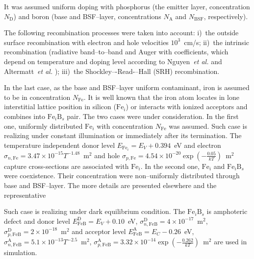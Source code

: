 It was assumed uniform doping with phosphorus (the emitter layer, concentration $N_\mathrm{D}$)
and boron (base and BSF--layer, concentrations $N_\mathrm{A}$ and $N_\mathrm{BSF}$, respectively).

The following recombination processes were taken into account:
i)~the outside surface recombination with electron and hole velocities $10^3$~cm/s;
ii)~the intrinsic recombination (radiative band--to--band and Auger with coefficients,
which depend on temperature and doping level according
to Nguyen~\emph{et al.} \cite{Si_BtB} and Altermatt~\emph{et al.} \cite{Si_Auger});
iii)~the Shockley–-Read-–Hall (SRH) recombination.

In the last case, as the base and BSF--layer uniform contaminant, iron is assumed to be in concentration $N_\mathrm{Fe}$.
It is well known that the iron atom locates in lone interstitial lattice position in silicon ($\mathrm{Fe}_i$) or
interacts with ionized acceptors and combines into $\mathrm{Fe}_i\mathrm{B}_s$ pair.
The two cases were under consideration.
In the first one, uniformly distributed $\mathrm{Fe}_i$ with concentration $N_\mathrm{Fe}$ was assumed.
Such case is realizing under constant illumination or immediately after its termination.
The temperature independent donor level $E_{\mathrm{Fe}_i} = E_V+0.394$~eV \cite{Rein2,MurphyJAP2011,Kohno}
and electron $\sigma_{n,{\mathrm{Fe}}}=3.47\times10^{-15}T^{-1.48}$~m$^2$ and
hole $\sigma_{p,{\mathrm{Fe}}}=4.54\times10^{-20}\exp\left(-\frac{0.05}{kT}\right)$~m$^2$ capture cross-sections \cite{ROUGIEUX2018,Paudyal}
are associated with $\mathrm{Fe}_i$.
In the second one, $\mathrm{Fe}_i$ and $\mathrm{Fe}_i\mathrm{B}_s$ were coexistence.
Their concentration were non--uniformly distributed through base and BSF--layer.
The more details are presented elsewhere \cite{Olikh2019SM} and the representative

Such case is realizing under dark equilibrium condition.
The $\mathrm{Fe}_i\mathrm{B}_s$ is amphoteric defect and donor level $E_{\mathrm{FeB}}^\mathrm{D}= E_V+0.10$~eV,
$\sigma_{n,{\mathrm{FeB}}}^\mathrm{D}=4\times10^{-17}$~m$^2$,
$\sigma_{p,{\mathrm{FeB}}}^\mathrm{D}=2\times10^{-18}$~m$^2$
and acceptor level $E_{\mathrm{FeB}}^\mathrm{A}= E_C-0.26$~eV,
$\sigma_{n,{\mathrm{FeB}}}^\mathrm{A}=5.1\times10^{-13}T^{-2.5}$~m$^2$,
$\sigma_{p,{\mathrm{FeB}}}^\mathrm{A}=3.32\times10^{-14}\exp\left(-\frac{0.262}{kT}\right)$~m$^2$
\cite{Istratov1999,Rein2,MurphyJAP2011,ROUGIEUX2018,Paudyal,FeB:kinetic}
are used in simulation.

